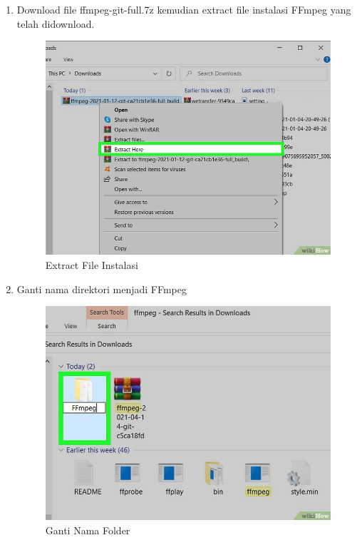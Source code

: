 \begin{enumerate}
\item Download file ffmpeg-git-full.7z kemudian extract file instalasi FFmpeg yang telah didownload.
\begin{figure}[H]
\centering
\includegraphics[scale=1.5]{figures/python7}
\caption{Extract File Instalasi}
\label{python7}
\end{figure}

\item Ganti nama direktori menjadi FFmpeg
\begin{figure}[H]
\centering
\includegraphics[scale=1.5]{figures/python8}
\caption{Ganti Nama Folder}
\label{python8}
\end{figure}


\end{enumerate}
